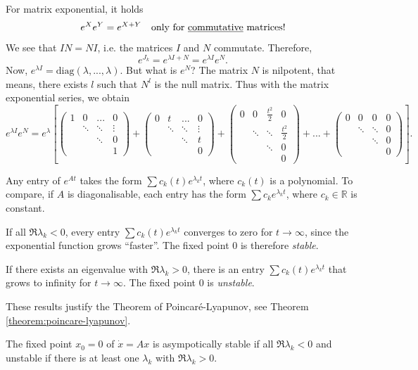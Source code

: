 \documentclass[hidelinks,a4paper, 11pt]{article}
\theoremstyle{plain}
\theoremstyle{break}
\theoremstyle{plain}
\theoremstyle{definition}
\begin{document}
For matrix exponential, it holds
\[
	e^{X}e^{Y} = e^{X+Y} \quad \text{only for \underline{commutative} matrices!}
\]
We see that $IN = NI$, i.e. the matrices $I$ and $N$ commutate. Therefore,
\[
	e^{J_k} = e^{\lambda I + N} = e^{\lambda I} e^{N}.
\]
Now, $e^{\lambda I} = \mathrm{diag}(\lambda, ..., \lambda)$. But what is $e^N$? The matrix $N$ is nilpotent, that means, there exists $l$ such that $N^l$ is the null matrix. Thus with the matrix exponential series, we obtain
\[
	e^{\lambda I}e^N = e^{\lambda}\left[\begin{pmatrix}
	1 & 0 & ... & 0 \\
& \ddots& \ddots & \vdots \\
& & \ddots  & 0 \\
& & & 1
	\end{pmatrix} + \begin{pmatrix}
	0 & t & ... & 0 \\
	& \ddots& \ddots & \vdots \\
	& & \ddots  & t \\
	& & & 0
	\end{pmatrix} 
	+ \begin{pmatrix}
	0 & 0 & \frac{t^2}{2} & 0 \\
	& \ddots& \ddots & \frac{t^2}{2} \\
	& & \ddots  & 0 \\
	& & & 0
	\end{pmatrix} + 	... + \begin{pmatrix}
	0 & 0 & 0 & 0 \\
	& \ddots& \ddots & 0 \\
	& & \ddots  & 0 \\
	& & & 0
	\end{pmatrix}
	\right].
\]

Any entry of $e^{At}$ takes the form $\sum c_k(t)e^{\lambda_k t}$, where $c_k(t)$ is a polynomial. To compare, if $A$ is diagonalisable, each entry has the form  $\sum c_ke^{\lambda_k t}$, where $c_k \in \mathbb R$ is constant.

If all $\Re \lambda_k < 0$, every entry $\sum c_k(t)e^{\lambda_k t}$ converges to zero for $t \to \infty$, since the exponential function grows ``faster''. The fixed point $0$ is therefore \emph{stable}. 

If there exists an eigenvalue with $\Re \lambda_k > 0$, there is an entry $\sum c_k(t)e^{\lambda_k t}$ that grows to infinity for $t \to \infty$. The fixed point $0$ is \emph{unstable}.

These results justify the Theorem of Poincaré-Lyapunov, see Theorem \ref{theorem:poincare-lyapunov}.
\begin{framed}
	The fixed point $ x_0 =  0$ of $\dot  x = A x$ is asympotically stable if all $\Re \lambda_k < 0$ and unstable if there is at least one $\lambda_k$ with $\Re \lambda_k > 0$.
\end{framed}
\end{document}
